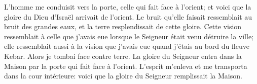 L’homme me conduisit vers la porte, celle qui fait face à l’orient;
	et voici que la gloire du Dieu d’Israël arrivait de l’orient.
Le bruit qu’elle faisait ressemblait au bruit des grandes eaux,
	et la terre resplendissait de cette gloire.
Cette vision ressemblait à celle que j’avais eue
		lorsque le Seigneur était venu détruire la ville;
	elle ressemblait aussi à la vision que j’avais eue
		quand j’étais au bord du fleuve Kebar.
Alors je tombai face contre terre.
La gloire du Seigneur entra dans la Maison par la porte qui fait face à l’orient.
L’esprit m’enleva et me transporta dans la cour intérieure:
	voici que la gloire du Seigneur remplissait la Maison.
